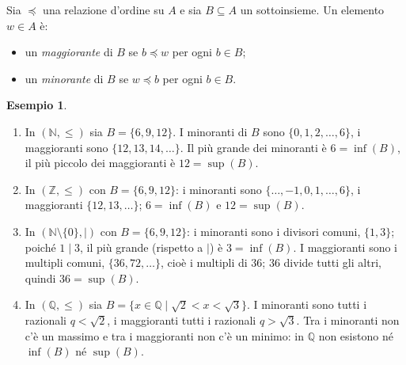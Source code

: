 \documentclass[11pt,a4paper]{article}
\theoremstyle{definition}
\newtheorem*{esempio}{Esempio}
\begin{document}
\begin{definizione}
Sia $\preceq$ una relazione d'ordine su $A$ e sia $B \subseteq A$ un
sottoinsieme. Un elemento $w \in A$ è:
\begin{itemize}
    \item un \emph{maggiorante} di $B$ se $b \preceq w$ per ogni
          $b \in B$;
    \item un \emph{minorante} di $B$ se $w \preceq b$ per ogni $b \in B$.
\end{itemize}
\end{definizione}

\begin{esempio}
\leavevmode
\begin{enumerate}
    \item In $(\mathbb{N}, \leq)$ sia $B = \{6, 9, 12\}$.
          I minoranti di $B$ sono $\{0, 1, 2, \dots, 6\}$, i maggioranti
          sono $\{12, 13, 14, \dots\}$. Il più grande dei minoranti è
          $6 = \inf(B)$, il più piccolo dei maggioranti è
          $12 = \sup(B)$.

    \item In $(\mathbb{Z}, \leq)$ con $B = \{6, 9, 12\}$: i minoranti sono
          $\{\dots, -1, 0, 1, \dots, 6\}$, i maggioranti
          $\{12, 13, \dots\}$; $6 = \inf(B)$ e $12 = \sup(B)$.

    \item In $(\mathbb{N} \setminus \{0\}, \mid)$ con $B = \{6, 9, 12\}$:
          i minoranti sono i divisori comuni, $\{1, 3\}$; poiché $1 \mid 3$,
          il più grande (rispetto a $\mid$) è $3 = \inf(B)$. I maggioranti
          sono i multipli comuni, $\{36, 72, \dots\}$, cioè i multipli di
          $36$; $36$ divide tutti gli altri, quindi $36 = \sup(B)$.

    \item In $(\mathbb{Q}, \leq)$ sia
          $B = \{x \in \mathbb{Q} \mid \sqrt{2} < x < \sqrt{3}\}$.
          I minoranti sono tutti i razionali $q < \sqrt{2}$, i maggioranti
          tutti i razionali $q > \sqrt{3}$. Tra i minoranti non c'è un
          massimo e tra i maggioranti non c'è un minimo: in $\mathbb{Q}$
          non esistono né $\inf(B)$ né $\sup(B)$.
\end{enumerate}
\end{esempio}
\end{document}
